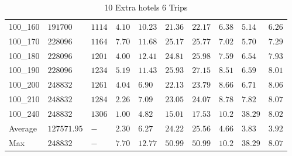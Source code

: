 \begin{center}
\begin{table}[]
\begin{adjustwidth}{-0.4in}{-1in}
\begin{tabular}{|lll|l|l|ll|lll|}
100\_160 & $191700   $ & $1114$ & $4.10$ & $10.23$  & $21.36$    & $22.17$   & $6.38$ & $5.14 $  & $6.26$ \\
100\_170 & $228096   $ & $1164$ & $7.70$ & $11.68$  & $25.17$    & $25.77$   & $7.02$ & $5.70 $  & $7.29$ \\
100\_180 & $228096   $ & $1201$ & $4.00$ & $12.41$  & $24.81$    & $25.98$   & $7.59$ & $6.54 $  & $7.93$ \\
100\_190 & $228096   $ & $1234$ & $5.19$ & $11.43$  & $25.93$    & $27.15$   & $8.51$ & $6.59 $  & $8.01$ \\
100\_200 & $248832   $ & $1261$ & $4.04$ & $6.90 $  & $22.13$    & $23.79$   & $8.66$ & $6.71 $  & $8.06$ \\
100\_210 & $248832   $ & $1284$ & $2.26$ & $7.09 $  & $23.05$    & $24.07$   & $8.78$ & $7.82 $  & $8.07$ \\
100\_240 & $248832   $ & $1306$ & $1.00$ & $4.82 $  & $15.01$    & $17.53$   & $10.2$ &3$ 8.29$  & $8.02$ \\
\hline
Average  & $127571.95$ & $-   $ & $2.30$ & $6.27 $  & $24.22$    & $25.56$   & $4.66$ & $3.83 $  & $3.92$ \\
Max      & $248832   $ & $-   $ & $7.70$ & $12.77$  & $50.99$    & $50.99$   & $10.2$ &3$ 8.29$  & $8.07$ \\
\hline
\end{tabular}
    \end{adjustwidth}
    \caption{10 Extra hotels 6 Trips}
    \label{10-6}
    \end{table}
\end{center}
